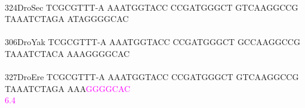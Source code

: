 \documentclass[11pt,twoside,reqno,a4paper]{article}
\begin{document}
{\hspace*{4\charwidth}\hspace*{7\charwidth}\hspace*{1\charwidth}\hspace*{1\charwidth}\hspace*{1\charwidth}\hspace*{1\charwidth}\hspace*{1\charwidth}\hspace*{1\charwidth}\\
324\hspace*{1\charwidth}DroSec	TCGCGTTT-A	AAATGGTACC	CCGATGGGCT	GTCAAGGCCG	TAAATCTAGA	ATAGGGGCAC	\\
\hspace*{4\charwidth}\hspace*{7\charwidth}\hspace*{1\charwidth}\hspace*{1\charwidth}\hspace*{1\charwidth}\hspace*{1\charwidth}\hspace*{1\charwidth}\hspace*{1\charwidth}\\
306\hspace*{1\charwidth}DroYak	TCGCGTTT-A	AAATGGTACC	CCGATGGGCT	GCCAAGGCCG	TAAATCTACA	AAAGGGGCAC	\\
\hspace*{4\charwidth}\hspace*{7\charwidth}\hspace*{1\charwidth}\hspace*{1\charwidth}\hspace*{1\charwidth}\hspace*{1\charwidth}\hspace*{1\charwidth}\hspace*{1\charwidth}\\
327\hspace*{1\charwidth}DroEre	TCGCGTTT-A	AAATGGTACC	CCGATGGGCT	GTCAAGGCCG	TAAATCTAGA	AAA\textcolor{magenta}{G}\textcolor{magenta}{G}\textcolor{magenta}{G}\textcolor{magenta}{G}\textcolor{magenta}{C}\textcolor{magenta}{A}\textcolor{magenta}{C}	\\
\hspace*{4\charwidth}\hspace*{7\charwidth}\hspace*{1\charwidth}\hspace*{1\charwidth}\hspace*{1\charwidth}\hspace*{1\charwidth}\hspace*{1\charwidth}\hspace*{53\charwidth}\textcolor{magenta}{6.4}\hspace*{1\charwidth}\\
}
\end{document}
